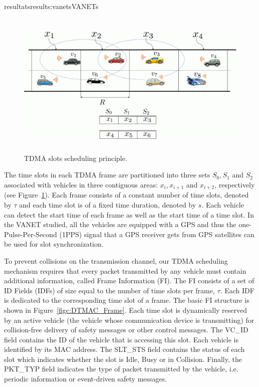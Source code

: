 \documentclass{ra2016}
\begin{document}
\begin{module}{resultats}{results:vanets}{VANETs}
\begin{figure}[!htbp]
  \begin{center}
  \includegraphics[height=7cm,width=14cm]{IMG/DTMAC_idea.pdf}
  \end{center}
  \caption{TDMA slots scheduling principle.}
 \label{figc:DTMAC_idea}
\end{figure}

The time slots in each TDMA frame are partitioned into three sets $S_0, S_1$ and $S_2$ associated with vehicles in three 
contiguous areas: $x_i, x_{i+1}$ and $x_{i+2}$, respectively (see Figure~\ref{figc:DTMAC_idea}). Each frame consists of a 
constant number of time slots, denoted by $\tau$ and each time slot is of a fixed time duration, denoted by $s$. Each vehicle 
can detect the start time of each frame as well as the start time of a time slot. In the VANET studied, all the vehicles are 
equipped with a GPS and thus the one-Pulse-Per-Second (1PPS) signal that a GPS receiver gets from GPS 
satellites can be used for slot synchronization. 

To prevent collisions on the transmission channel, our TDMA scheduling mechanism requires that every packet transmitted by 
any vehicle must contain additional information, called Frame Information (FI). The FI consists of a set of ID Fields (IDFs) of 
size equal to the number of time slots per frame, $\tau$. Each IDF is dedicated to the corresponding time slot of a frame. The 
basic FI structure is shown in Figure~\ref{figc:DTMAC_Frame}.
Each time slot is dynamically reserved by an active vehicle 
(the vehicle whose communication device is transmitting) for collision-free delivery of safety messages or other control messages.
The VC\_ID field contains the ID of the vehicle that is accessing this slot. Each vehicle is identified by its MAC address. The 
SLT\_STS field contains the status of each slot which indicates whether the slot is Idle, Busy or in Collision. Finally, the 
PKT\_TYP field indicates the type of packet transmitted by the vehicle, i.e. periodic information or event-driven safety messages.


\end{module}
\end{document}

